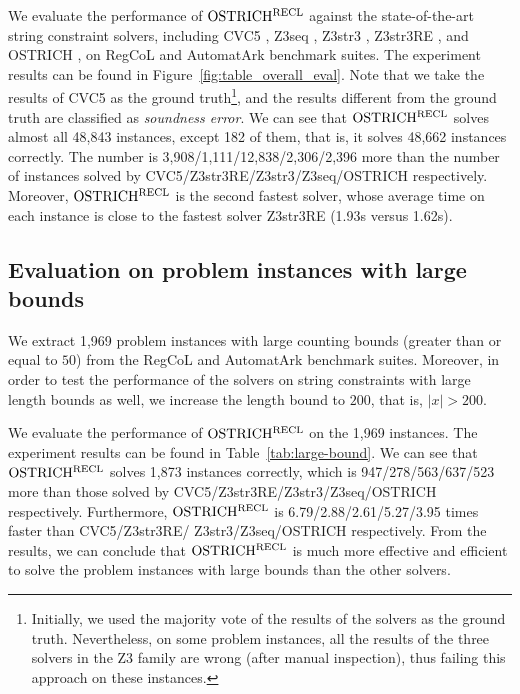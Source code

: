 We evaluate the performance of $\rm OSTRICH^{RECL}$ against the state-of-the-art string constraint solvers, including CVC5
\cite{cvc5}, Z3seq \cite{z3seq}, Z3str3
\cite{Z3-str3}, Z3str3RE \cite{BD+23}, and OSTRICH
\cite{CHL+19}, on RegCoL and AutomatArk benchmark suites.
The experiment results can be found in Figure~\ref{fig:table_overall_eval}. Note that we take the results of CVC5 as the ground truth\footnote{Initially,  we used the majority vote of the results of the solvers as the ground truth. Nevertheless, on some problem instances, all the results of the three solvers in the Z3 family are wrong (after manual inspection), thus failing this approach on these instances.}, and the results different from the ground truth are classified as \emph{soundness error}. We can see that $\rm OSTRICH^{RECL}$ solves almost all 48,843 instances, except 182 of them, that is, it solves 48,662 instances correctly. The number is 3,908/1,111/12,838/2,306/2,396 more than the number of instances solved by CVC5/Z3str3RE/Z3str3/Z3seq/OSTRICH respectively.
%
Moreover, $\rm OSTRICH^{RECL}$ is the second fastest solver, whose average time on each instance is close to the fastest solver Z3str3RE (1.93s versus 1.62s). 


%


\subsection{Evaluation on problem instances with large bounds}\label{subsec:large_bounds_eval}

We extract 1,969 problem instances with large counting bounds (greater than or equal to $50$) from the RegCoL and AutomatArk benchmark suites.  
Moreover, in order to test the performance of the solvers on string constraints with large length bounds as well, we increase the length bound to $200$, that is, $|x| > 200$.

We evaluate the performance of $\rm OSTRICH^{RECL}$ on the 1,969 instances. 
The experiment results can be found in Table~\ref{tab:large-bound}. We can see that $\rm OSTRICH^{RECL}$ solves 1,873 instances correctly, which is 947/278/563/637/523 more than those solved by CVC5/Z3str3RE/Z3str3/Z3seq/OSTRICH respectively. Furthermore, $\rm OSTRICH^{RECL}$ is 6.79/2.88/2.61/5.27/3.95 times faster than CVC5/Z3str3RE/ Z3str3/Z3seq/OSTRICH respectively. From the results, we can conclude that $\rm OSTRICH^{RECL}$ is much more effective and efficient to solve the problem instances with large bounds than the other solvers.  

